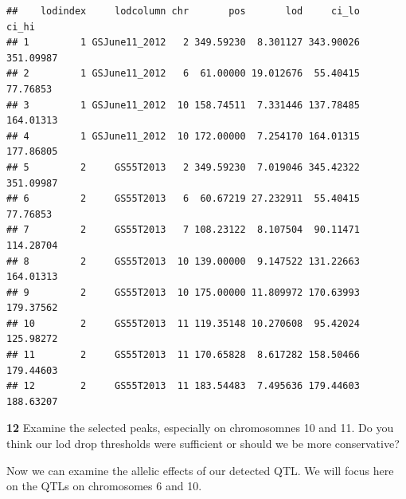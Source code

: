 \documentclass[
]{book}
\makeatletter
\newenvironment{kframe}{%
\medskip{}
\setlength{\fboxsep}{.8em}
 \def\at@end@of@kframe{}%
 \ifinner\ifhmode%
  \def\at@end@of@kframe{\end{minipage}}%
  \begin{minipage}{\columnwidth}%
 \fi\fi%
 \def\FrameCommand##1{\hskip\@totalleftmargin \hskip-\fboxsep
 \colorbox{shadecolor}{##1}\hskip-\fboxsep
     \hskip-\linewidth \hskip-\@totalleftmargin \hskip\columnwidth}%
 \MakeFramed {\advance\hsize-\width
   \@totalleftmargin\z@ \linewidth\hsize
   \@setminipage}}%
 {\par\unskip\endMakeFramed%
 \at@end@of@kframe}
\newenvironment{rmdblock}[1]
  {
  \begin{itemize}
  \renewcommand{\labelitemi}{
    \raisebox{-.7\height}[0pt][0pt]{
      {\setkeys{Gin}{width=3em,keepaspectratio}\texttt{[image: images/\#1]}}
    }
  }
  \setlength{\fboxsep}{1em}
  \begin{kframe}
  \item
  }
  {
  \end{kframe}
  \end{itemize}
  }
\newenvironment{rmdquiz}
  {\begin{rmdblock}{quiz}}
  {\end{rmdblock}}
\makeatother
\begin{document}
\begin{verbatim}
##    lodindex     lodcolumn chr       pos       lod     ci_lo     ci_hi
## 1         1 GSJune11_2012   2 349.59230  8.301127 343.90026 351.09987
## 2         1 GSJune11_2012   6  61.00000 19.012676  55.40415  77.76853
## 3         1 GSJune11_2012  10 158.74511  7.331446 137.78485 164.01313
## 4         1 GSJune11_2012  10 172.00000  7.254170 164.01315 177.86805
## 5         2     GS55T2013   2 349.59230  7.019046 345.42322 351.09987
## 6         2     GS55T2013   6  60.67219 27.232911  55.40415  77.76853
## 7         2     GS55T2013   7 108.23122  8.107504  90.11471 114.28704
## 8         2     GS55T2013  10 139.00000  9.147522 131.22663 164.01313
## 9         2     GS55T2013  10 175.00000 11.809972 170.63993 179.37562
## 10        2     GS55T2013  11 119.35148 10.270608  95.42024 125.98272
## 11        2     GS55T2013  11 170.65828  8.617282 158.50466 179.44603
## 12        2     GS55T2013  11 183.54483  7.495636 179.44603 188.63207
\end{verbatim}

\begin{rmdquiz}
\textbf{12}
Examine the selected peaks, especially on chromosomnes 10 and 11. Do you think our lod drop thresholds were sufficient or should we be more conservative?
\end{rmdquiz}

Now we can examine the allelic effects of our detected QTL. We will focus here on the QTLs on chromosomes 6 and 10.
\end{document}
